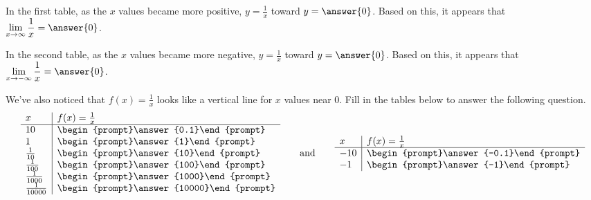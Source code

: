 \documentclass{ximera}
\begin{document}
\begin{problem}
In the first table, as the $x$ values became more positive, $y = \frac{1}{x}$  toward $y = \answer{0}$.  Based on this, it appears that $\displaystyle\lim_{x \to \infty} \frac{1}{x} = \answer{0}$.

In the second table, as the $x$ values became more negative, $y = \frac{1}{x}$  toward $y = \answer{0}$.  Based on this, it appears that $\displaystyle\lim_{x \to -\infty} \frac{1}{x} = \answer{0}$.

\end{problem}

\begin{problem}
We've also noticed that $f(x) = \frac{1}{x}$ looks like a vertical line for $x$ values near $0$.  Fill in the tables below to answer the following question. 
  \[
  \begin{array}{l|l}
    x      & f(x) = \frac{1}{x}     \\ \hline
    10    & \begin{prompt}\answer{0.1}\end{prompt}\\
    1  & \begin{prompt}\answer{1}\end{prompt}\\
    \frac{1}{10}  & \begin{prompt}\answer{10}\end{prompt}\\
    \frac{1}{100} & \begin{prompt}\answer{100}\end{prompt} \\
    \frac{1}{1000} & \begin{prompt}\answer{1000}\end{prompt} \\
    \frac{1}{10000} & \begin{prompt}\answer{10000}\end{prompt} \\
  \end{array}
  \qquad\text{and}\qquad
  \begin{array}{l|l}
    x      & f(x) = \frac{1}{x}     \\ \hline
    -10    & \begin{prompt}\answer{-0.1}\end{prompt}\\
    -1  & \begin{prompt}\answer{-1}\end{prompt}\\

\end{array}\]
\end{problem}
\end{document}
